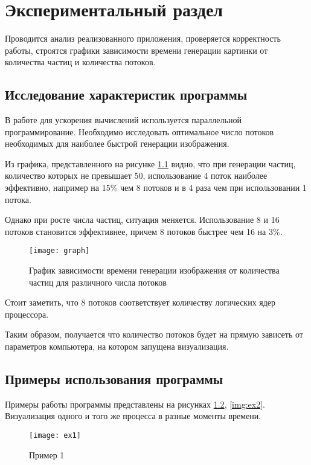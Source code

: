 \chapter{\textbf{Экспериментальный раздел}}

\hfill

Проводится анализ реализованного приложения, проверяется корректность работы, строятся графики зависимости времени генерации картинки от количества частиц и количества потоков. 

\section{\textbf{Исследование характеристик программы }}

В работе для ускорения вычислений используется параллельной программирование. Необходимо исследовать оптимальное число потоков необходимых для наиболее быстрой генерации изображения. 

Из графика, представленного на рисунке \ref{img:graph} видно, что при генерации частиц, количество которых не превышает 50, использование 4 поток наиболее эффективно, например на 15\% чем 8 потоков и в 4 раза чем при использовании 1 потока. 

Однако при росте числа частиц, ситуация меняется. Использование 8 и 16 потоков становится эффективнее, причем 8 потоков быстрее чем 16 на 3\%. 

\begin{figure}[H]
	\centering
	\texttt{[image: graph]}
	\caption{График зависимости времени генерации изображения от количества частиц для различного числа потоков}
	\label{img:graph}
\end{figure}

Стоит заметить, что 8 потоков соответствует количеству логических ядер процессора. 

Таким образом, получается что количество потоков будет на прямую зависеть от параметров компьютера, на котором запущена визуализация. 

\section{\textbf{Примеры использования программы }}

Примеры работы программы представлены на рисунках \ref{img:ex1}, \ref{img:ex2}. Визуализация одного и того же процесса в разные моменты времени. 

\begin{figure}[H]
	\centering
	\texttt{[image: ex1]}
	\caption{Пример 1}
	\label{img:ex1}
\end{figure}

